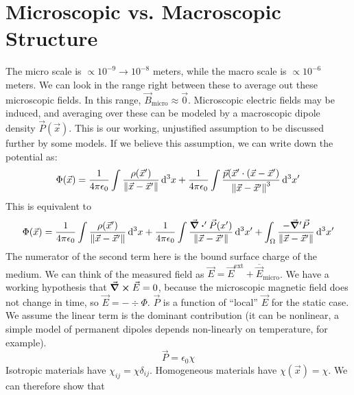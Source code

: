\documentclass[a4paper,twoside,master.tex]{subfiles}
\begin{document}

\section{Microscopic vs. Macroscopic Structure}
\label{sec:microscopic_vs_macroscopic_structure}

The micro scale is $\propto 10^{-9} \to 10^{-8}$ meters, while the macro scale is $\propto 10^{-6}$ meters. We can look in the range right between these to average out these microscopic fields. In this range, $\vec{B}_{\text{micro}}\approx \vec{0}$. Microscopic electric fields may be induced, and averaging over these can be modeled by a macroscopic dipole density $ \vec{P} ( \vec{x} )$. This is our working, unjustified assumption to be discussed further by some models. If we believe this assumption, we can write down the potential as:
\begin{equation}
    \Phi ( \vec{x} ) = \frac{1}{4 \pi \epsilon_{0}} \int \frac{\rho ( \vec{x}' )}{\norm{ \vec{x} - \vec{x}' }}  \dd[3]{x} + \frac{1}{4 \pi \epsilon_0} \int \frac{ \vec{p} ( \vec{x}' \cdot ( \vec{x} - \vec{x}' )}{\norm{ \vec{x} - \vec{x}'}^3} \dd[3]{x'}
\end{equation}
This is equivalent to
\begin{equation}
    \Phi ( \vec{x} ) = \frac{1}{4 \pi \epsilon_0} \int \frac{\rho ( \vec{x}' )}{\norm{ \vec{x} - \vec{x}'}} \dd[3]{x} + \frac{1}{4 \pi \epsilon_0} \int \frac{\div'{ \vec{P} (x')}}{\norm{ \vec{x} - \vec{x}'}} \dd[3]{x'} + \int_{\Omega} \frac{- \grad'{ \vec{P}}}{\norm{ \vec{x} - \vec{x}'} } \dd[3]{x'}
\end{equation}
The numerator of the second term here is the bound surface charge of the medium. We can think of the measured field as $ \vec{E} = \vec{E}^{\text{ext}} + \overline{\vec{E}}_{\text{micro}}$. We have a working hypothesis that $ \curl{ \vec{E}} = 0$, because the microscopic magnetic field does not change in time, so $ \vec{E} = - \div{\Phi}$. $\vec{P}$ is a function of ``local'' $ \vec{E}$ for the static case. We assume the linear term is the dominant contribution (it can be nonlinear, a simple model of permanent dipoles depends non-linearly on temperature, for example).
\begin{equation}
    \vec{P} = \epsilon_0 \chi
\end{equation}
Isotropic materials have $ \chi_{ij} = \chi \delta_{ij}$. Homogeneous materials have $ \chi ( \vec{x} ) = \chi$. We can therefore show that
\end{document}
